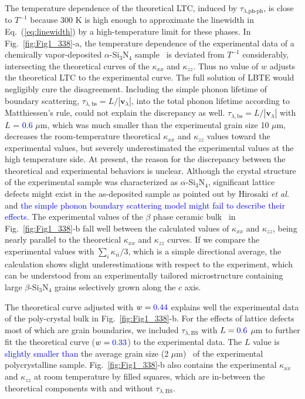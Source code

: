 \documentclass[twocolumn,amsmath,amssymb,a4paper,prb,superscriptaddress,floatfix]{revtex4-1}
\begin{document}
The temperature dependence of the theoretical LTC, induced by
$\tau_{\lambda\text{,ph-ph}}$, is close to $T^{-1}$ because 300 K is high
enough to approximate the linewidth in Eq.~(\ref{eq:linewidth}) by a
high-temperature limit for these phases.  In Fig.~\ref{fig:Fig1_338}-a, the
temperature dependence of the experimental data of a chemically vapor-deposited
$\alpha$-Si$_3$N$_4$ sample~\cite{hirai} is deviated from $T^{-1}$
considerably, intersecting the theoretical curves of the $\kappa$$_{xx}$ and
$\kappa$$_{zz}$.  Thus no value of $w$ adjusts the theoretical LTC to the
experimental curve.  The full solution of LBTE would negligibly cure the
disagreement.  Including the simple phonon lifetime of boundary scattering,
$\tau_{\lambda,\text{bs}}=L/|\mathbf{v}_\lambda|$, into the total phonon
lifetime according to Matthiessen's rule, could not explain the discrepancy as
well.  $\tau_{\lambda,\text{bs}}=L/|\mathbf{v}_\lambda|$ with $L$ = \textcolor{blue}{0.6}
$\mu\text{m}$, which was much smaller than the experimental grain size 10
$\mu\text{m}$, decreases the room-temperature theoretical $\kappa$$_{xx}$ and
$\kappa$$_{zz}$ values toward the experimental values, but severely
underestimated the experimental values at the high temperature side.  At
present, the reason for the discrepancy between the theoretical and
experimental behaviors is unclear.  Although the crystal structure of the
experimental sample was characterized as $\alpha$-Si$_3$N$_4$, significant
lattice defects might exist in the as-deposited sample as pointed out by
Hirosaki {\it et al.}~\cite{hirosaki-md} and \textcolor{blue}{the simple phonon boundary
scattering model might fail to describe their effects.} The
experimental values of the $\beta$ phase ceramic bulk~\cite{hirosaki} in
Fig.~\ref{fig:Fig1_338}-b fall well between the calculated values of
$\kappa$$_{xx}$ and  $\kappa$$_{zz}$, being nearly parallel to the theoretical
$\kappa$$_{xx}$ and  $\kappa$$_{zz}$ curves.  If we compare the experimental
values with $\sum_i \kappa_{ii}/3$, which is a simple directional average, the
calculation shows slight underestimations with respect to the experiment, which
can be understood from an experimentally tailored microstructure containing
large $\beta$-Si$_3$N$_4$ grains selectively grown along the $c$
axis.~\cite{hirosaki}

The theoretical curve adjusted with $w=\textcolor{blue}{0.44}$ explains well the experimental
data of the poly-crystal bulk in Fig.~\ref{fig:Fig1_338}-b.  For the effects of
lattice defects most of which are grain boundaries, we included
$\tau_{\lambda,\text{BS}}$ with $L = \textcolor{blue}{0.6}$ $\mu\text{m}$ to further fit the
theoretical curve ($w=\textcolor{blue}{0.33}$) to the experimental data.  The $L$ value is
\textcolor{blue}{slightly smaller than} the average grain size (2 $\mu\text{m}$)~\cite{hirosaki} of the
experimental polycrystalline sample.  Fig.~\ref{fig:Fig1_338}-b also contains
the experimental $\kappa$$_{xx}$ and $\kappa$$_{zz}$ at room temperature by
filled squares, which are in-between the theoretical components with and
without $\tau_{\lambda,\text{BS}}$. 
\end{document}

